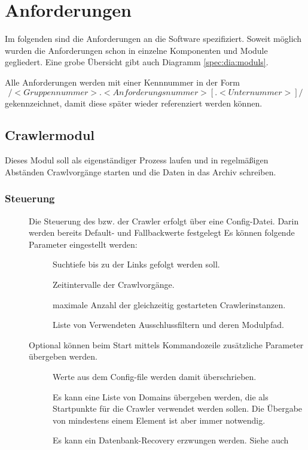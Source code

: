 \chapter{Anforderungen}
Im folgenden sind die Anforderungen an die Software spezifiziert. Soweit möglich wurden
die Anforderungen schon in einzelne Komponenten und Module gegliedert. Eine grobe Übersicht gibt auch Diagramm \ref{spec:dia:moduls}.

Alle Anforderungen werden mit einer Kennnummer in der Form 
\[ /<Gruppennummer> . <Anforderungsnummer> [. <Unternummer> ]/ \]
gekennzeichnet, damit diese später wieder referenziert werden können.

\section{Crawlermodul}
Dieses Modul soll als eigenständiger Prozess laufen und in regelmäßigen Abständen Crawlvorgänge starten
und die Daten in das Archiv schreiben.

\subsection{Steuerung}
\begin{description}
	\item []
		Die Steuerung des bzw. der Crawler erfolgt über eine Config-Datei.
		Darin werden bereits Default- und Fallbackwerte festgelegt  
		Es können folgende Parameter eingestellt werden:
		\begin{description}
			\item []
				Suchtiefe bis zu der Links gefolgt werden soll.
			\item []
				Zeitintervalle der Crawlvorgänge.
			\item []
				maximale Anzahl der gleichzeitig gestarteten Crawlerinstanzen.
			\item []
				Liste von Verwendeten Ausschlussfiltern und deren Modulpfad.
		\end{description}
	\item []
		Optional können beim Start mittels Kommandozeile zusätzliche Parameter übergeben werden.
		\begin{description}
			\item []
				Werte aus dem Config-file werden damit überschrieben.
			\item []
				Es kann eine Liste von Domains übergeben werden, 
				die als Startpunkte für die Crawler verwendet werden sollen.
				Die Übergabe von mindestens einem Element ist aber immer notwendig.
			\item []
				Es kann ein Datenbank-Recovery erzwungen werden. Siehe auch 
		\end{description}
\end{description}

